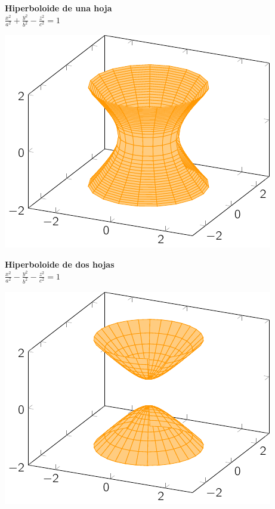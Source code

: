 \documentclass[11pt, a4paper]{article}
\newif\IfInSansMode
\theoremstyle{theorem-style}
\theoremstyle{definition-style}
\theoremstyle{remark-style}
\theoremstyle{example-style}
\begin{document}
\begin{minipage}[c]{0.45\textwidth}
  {\bf Hiperboloide de una hoja}\vspace{1em}\\
  $\displaystyle \frac{{x}^2}{a^2} + \frac{{y}^2}{b^2}-\frac{{z}^2}{c^2} = 1$
\end{minipage}\hfill
\begin{minipage}[]{0.45\textwidth}
\includegraphics{./img/hip1.pdf}
\end{minipage}

\begin{minipage}[c]{0.45\textwidth}
  {\bf Hiperboloide de dos hojas}\vspace{1em}\\
  $\displaystyle \frac{{x}^2}{a^2} - \frac{{y}^2}{b^2}-\frac{{z}^2}{c^2} = 1$
\end{minipage}\hfill
\begin{minipage}[]{0.45\textwidth}
\includegraphics{./img/hip2.pdf}
\end{minipage}
\end{document}
